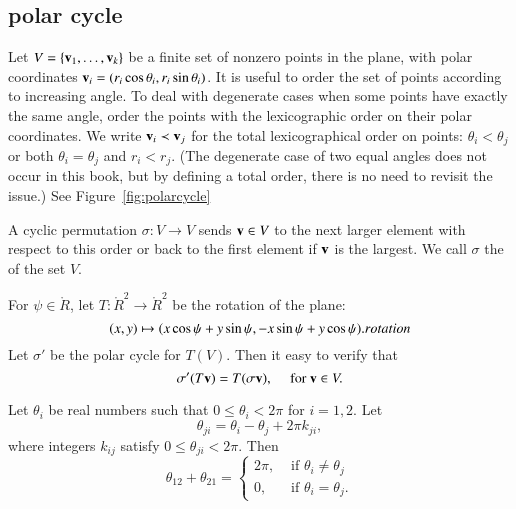 \subsection{polar cycle}

Let $V=\{{\mathbf v}_1,\ldots,{\mathbf v}_k\}$ be a finite set of nonzero points in the
plane, with polar coordinates ${\mathbf v}_i =
(r_i\cos\theta_i,r_i\sin\theta_i)$.  It is useful to order the set of
points according to increasing angle.  To deal with degenerate cases
when some points have exactly the same angle, order the points with
the lexicographic order on their polar coordinates.  We write ${\mathbf v}_i \prec
{\mathbf v}_j$ for the total lexicographical order on points: 
$\theta_i < \theta_j$ or both $\theta_i=\theta_j$ and $r_i<r_j$.
(The degenerate case of two equal angles does not occur in this book, but by
defining a total order, there is no need to revisit the issue.)
See Figure~\ref{fig:polarcycle}
%

\figROHSJRP %

\begin{definition}
A cyclic permutation $\sigma:V\to V$ sends ${\mathbf v}\in V$ to
the next larger element with respect to this order or back to the
first element if ${\mathbf v}$ is the largest.  We call $\sigma$ the
 of the set $V$.
\end{definition}
%
%
%
%




For $\psi\in\ring{R}$, let $T:\ring{R}^2\to\ring{R}^2$ be the
rotation of the plane:
\begin{equation}
\label{eqn:rotate}
(x,y) \mapsto  (x\cos\psi + y\sin\psi,-x\sin\psi+y\cos\psi).
\indy{Index}{rotation}%
\end{equation}
Let $\sigma'$ be the polar cycle for $T(V)$.  Then it easy to verify
that
\[ 
\sigma'(T {\mathbf v}) = T (\sigma {\mathbf v}),\quad \text{ for } {\mathbf v}\in V. 
\] 
%
%

\begin{lemma}[]\label{lemma:polar2}
   Let $\theta_i$ be real numbers such that $0\le
  \theta_i < 2\pi$ for $i=1,2$.  Let \[  \theta_{ji}
    = \theta_i - \theta_j + 2\pi k_{ji},
\] 
where integers $k_{ij}$ satisfy $0\le \theta_{ji}< 2\pi$.
Then 
\[ 
\theta_{12} + \theta_{21} = \begin{cases}
2\pi, & \text{ if }\theta_i\ne\theta_j\\
0,    & \text{ if }\theta_i=\theta_j.
\end{cases}
\] 
\end{lemma}
%

